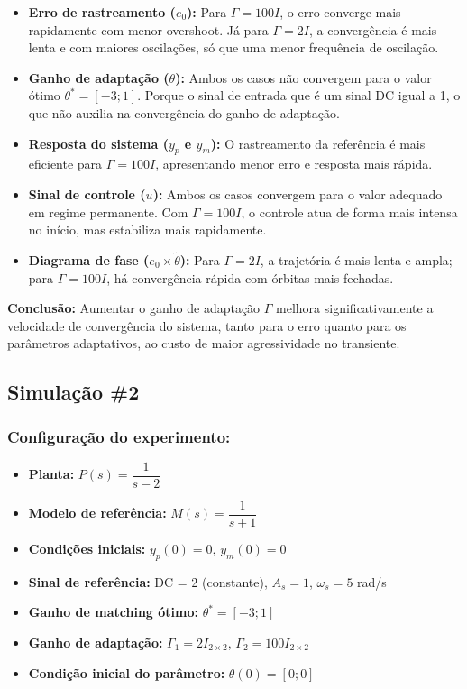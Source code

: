 \documentclass[10pt]{article}
\begin{document}
\begin{itemize}
    \item \textbf{Erro de rastreamento ($e_0$):} Para $\Gamma = 100I$, o erro converge mais rapidamente com menor overshoot. Já para $\Gamma = 2I$, a convergência é mais lenta e com maiores oscilações, só que uma menor frequência de oscilação.

    \item \textbf{Ganho de adaptação ($\theta$):} Ambos os casos não convergem para o valor ótimo $\theta^* = [-3;1]$. Porque o sinal de entrada que é um sinal DC igual a 1, o que não auxilia na convergência do ganho de adaptação.

    \item \textbf{Resposta do sistema ($y_p$ e $y_m$):} O rastreamento da referência é mais eficiente para $\Gamma = 100I$, apresentando menor erro e resposta mais rápida.

    \item \textbf{Sinal de controle ($u$):} Ambos os casos convergem para o valor adequado em regime permanente. Com $\Gamma = 100I$, o controle atua de forma mais intensa no início, mas estabiliza mais rapidamente.

    \item \textbf{Diagrama de fase ($e_0 \times \tilde{\theta}$):} Para $\Gamma = 2I$, a trajetória é mais lenta e ampla; para $\Gamma = 100I$, há convergência rápida com órbitas mais fechadas.

\end{itemize}

\textbf{Conclusão:} Aumentar o ganho de adaptação $\Gamma$ melhora significativamente a velocidade de convergência do sistema, tanto para o erro quanto para os parâmetros adaptativos, ao custo de maior agressividade no transiente.

\newpage

\subsection{Simulação \#2}
\subsubsection{Configuração do experimento:}
\begin{itemize}
\item \textbf{Planta:} $P(s) = \dfrac{1}{s - 2}$
\item \textbf{Modelo de referência:} $M(s) = \dfrac{1}{s + 1}$
\item \textbf{Condições iniciais:} $y_p(0)=0$, $y_m(0)=0$
\item \textbf{Sinal de referência:} DC = 2 (constante), $A_s=1$, $\omega_s=5$ rad/s
\item \textbf{Ganho de matching ótimo:} $\theta^* = [-3;1]$
\item \textbf{Ganho de adaptação:} $\Gamma_1 = 2I_{2\times2}$, $\Gamma_2 = 100 I_{2\times2}$
\item \textbf{Condição inicial do parâmetro:} $\theta(0) = [0;0]$
\end{itemize}
\end{document}
